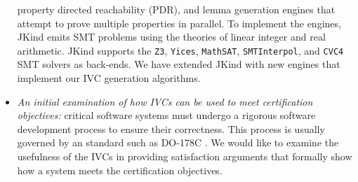 \begin{itemize}
property directed reachability (PDR), and lemma generation engines that attempt to prove
multiple properties in parallel. To implement the engines,
JKind emits SMT problems using the theories of linear integer and real arithmetic. JKind supports the \texttt{Z3}, \texttt{Yices}, \texttt{MathSAT}, \texttt{SMTInterpol}, and \texttt{CVC4} SMT solvers as back-ends.  We have extended JKind with new engines that implement our IVC generation algorithms.
\item \emph{An initial examination of how IVCs can be used to meet certification objectives:}  critical software systems must undergo a rigorous software development process to ensure their correctness. This process is usually governed by an standard such as DO-178C \cite{DO178C}. We would like to examine the usefulness of the IVCs in providing satisfaction arguments that formally show how a system meets the certification objectives.

\end{itemize}

